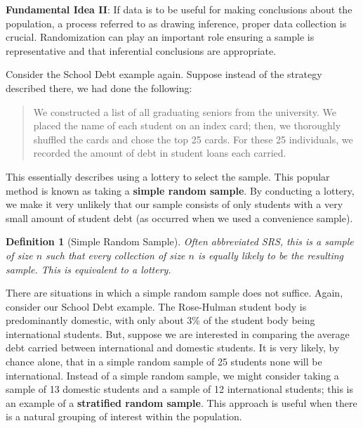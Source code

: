 \documentclass[
]{book}
\theoremstyle{plain}
\theoremstyle{mydefn}
\newtheorem{definition}{Definition}[chapter]
\theoremstyle{myexmpl}
\theoremstyle{remark}
\begin{document}
\begin{rmdfivefund}
\textbf{Fundamental Idea II}: If data is to be useful for making conclusions about the population, a process referred to as drawing inference, proper data collection is crucial. Randomization can play an important role ensuring a sample is representative and that inferential conclusions are appropriate.
\end{rmdfivefund}

Consider the School Debt example again. Suppose instead of the strategy described there, we had done the following:

\begin{quote}
We constructed a list of all graduating seniors from the university. We placed the name of each student on an index card; then, we thoroughly shuffled the cards and chose the top 25 cards. For these 25 individuals, we recorded the amount of debt in student loans each carried.
\end{quote}

This essentially describes using a lottery to select the sample. This popular method is known as taking a \textbf{simple random sample}. By conducting a lottery, we make it very unlikely that our sample consists of only students with a very small amount of student debt (as occurred when we used a convenience sample).

\begin{definition}[Simple Random Sample]
\protect\hypertarget{def:defn-simple-random-sample}{}{\label{def:defn-simple-random-sample} {} }Often abbreviated SRS, this is a sample of size \(n\) such that \emph{every} collection of size \(n\) is equally likely to be the resulting sample. This is equivalent to a lottery.
\end{definition}

There are situations in which a simple random sample does not suffice. Again, consider our School Debt example. The Rose-Hulman student body is predominantly domestic, with only about 3\% of the student body being international students. But, suppose we are interested in comparing the average debt carried between international and domestic students. It is very likely, by chance alone, that in a simple random sample of 25 students none will be international. Instead of a simple random sample, we might consider taking a sample of 13 domestic students and a sample of 12 international students; this is an example of a \textbf{stratified random sample}. This approach is useful when there is a natural grouping of interest within the population.
\end{document}

